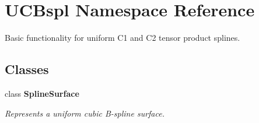 \section{UCBspl Namespace Reference}
\label{namespaceUCBspl}


Basic functionality for uniform C1 and C2 tensor product splines.  


\subsection*{Classes}
\begin{DoxyCompactItemize}
\item 
class {\bf SplineSurface}
\begin{DoxyCompactList}\small\item\em Represents a uniform cubic B-\/spline surface. \item\end{DoxyCompactList}\end{DoxyCompactItemize}
